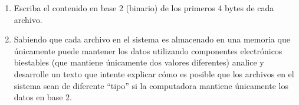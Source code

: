 \documentclass[12pt]{article}
\begin{document}
\begin{enumerate}
    \item Escriba el contenido en base 2 (binario) de los primeros 4 bytes de
        cada archivo.

    \item Sabiendo que cada archivo en el sistema es almacenado en una memoria
        que únicamente puede mantener los datos utilizando componentes
        electrónicos biestables (que mantiene únicamente dos valores
        diferentes) analice y desarrolle un texto que intente explicar cómo es
        posible que los archivos en el sistema sean de diferente ``tipo'' si
        la computadora mantiene únicamente los datos en base 2.

\end{enumerate}
\end{document}
